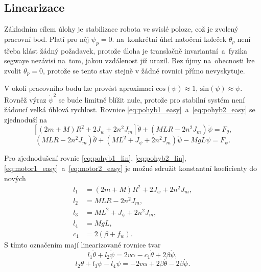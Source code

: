 \documentclass[conference]{IEEEtran}
\begin{document}
\subsection{Linearizace}
\label{sec:linearizace}

Základním cílem úlohy je stabilizace robota ve svislé poloze, což je zvolený pracovní bod.
Platí pro něj $\psi_p = 0$. na~konkrétní úhel natočení koleček $\theta_p$ není třeba klást žádný požadavek,
protože úloha je translačně invariantní~a~fyzika segwaye nezávisí na~tom, jakou vzdálenost již urazil.
Bez újmy na~obecnosti lze zvolit $\theta_p = 0$, protože se tento stav stejně v žádné rovnici přímo nevyskytuje.

V okolí pracovního bodu lze provést aproximaci $\text{cos}(\psi) \approx 1$, $\text{sin}(\psi) \approx \psi$. Rovněž výraz $\dot{\psi}^2$ se bude limitně blížit nule,
protože pro stabilní systém není žádoucí velká úhlová rychlost. Rovnice \eqref{eq:pohyb1_easy}~a~\eqref{eq:pohyb2_easy} se zjednoduší na
\begin{equation}
    \left[(2m + M) R^2 + 2 J_w + 2n^2 J_m\right] \ddot{\theta} + (MLR - 2n^2 J_m) \ddot{\psi} = F_\theta,
    \label{eq:pohyb1_lin}
\end{equation}
\begin{equation}
    (MLR - 2n^2 J_m) \ddot{\theta} + (ML^2 + J_\psi + 2n^2 J_m) \ddot{\psi} - MgL \psi = F_\psi.
    \label{eq:pohyb2_lin}
\end{equation}

Pro zjednodušení rovnic \eqref{eq:pohyb1_lin}, \eqref{eq:pohyb2_lin}, \eqref{eq:motor1_easy}~a~\eqref{eq:motor2_easy}
je možné sdružit konstantní koeficienty do nových 
\begin{equation}
    \begin{split}
        l_1 &= (2m + M) R^2 + 2 J_w + 2n^2 J_m, \\
        l_2 &= MLR - 2n^2 J_m, \\
        l_3 &= ML^2 + J_\psi + 2n^2 J_m, \\
        l_4 &= MgL, \\
        c_1 &= 2(\beta + f_w).
    \end{split}
\end{equation}
S tímto označením mají linearizované rovnice tvar
\begin{equation}
    l_1 \ddot{\theta} + l_2 \ddot{\psi} = 2v \alpha - c_1 \dot{\theta} + 2\beta\dot{\psi},
    \label{eq:pohyb1_lin_simple}
\end{equation}
\begin{equation}
    l_2 \ddot{\theta} + l_3 \ddot{\psi} - l_4 \psi = - 2v \alpha + 2\beta \dot{\theta} - 2\beta \dot{\psi}.
    \label{eq:pohyb2_lin_simple}
\end{equation}
\end{document}
